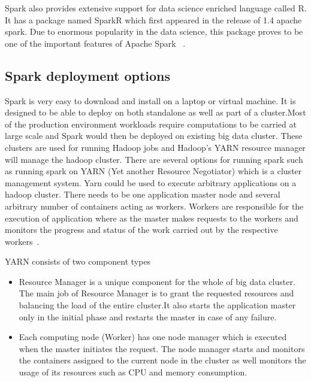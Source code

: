 Spark also provides extensive support for data science enriched language called 
R. It has a package named SparkR which first appeared in the release of 1.4 
apache spark. Due to enormous popularity in the data science, this package 
proves to be one of the important features of Apache Spark
~\cite{hid-sp18-410-spark-architecture}.

\subsection{Spark deployment options}
Spark is very easy to download and install on a laptop or virtual machine. 
It is designed to be able to deploy on both standalone as well as part of a 
cluster.Most of the production environment workloads require computations to 
be carried at large scale and Spark would then be deployed on existing big data 
cluster. These clusters are used for running Hadoop jobs and Hadoop's YARN 
resource manager will manage the hadoop cluster. There are several options for 
running  spark such as running spark on YARN (Yet another Resource Negotiator) 
which is a cluster management system.
Yarn could be used to execute arbitrary applications on a hadoop cluster. 
There needs to be one application master node and several arbitrary number of 
containers acting as workers. Workers are responsible for the execution of 
application where as the master makes requests to the workers and monitors the 
progress and status of the work carried out by the respective workers~\cite{hid-sp18-410-spark-architecture}.

YARN consists of two component types

\begin{itemize}

\item Resource Manager is a unique component for the whole of big data cluster. The 
main job of Resource Manager is to grant the requested resources and balancing 
the load of the entire cluster.It also starts the application master only in 
the initial phase and restarts the master in case of any failure.

\item Each computing node (Worker) has one node manager  which is executed when the 
master initiates the request. The node manager starts and monitors the 
containers assigned to the current node in the cluster as well monitors the 
usage of its resources such as CPU and memory consumption.

\end{itemize}

